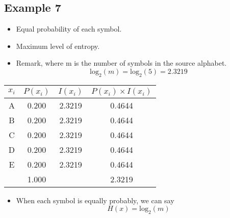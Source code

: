 \documentclass[12pt]{article}
\begin{document}
\subsection*{Example 7}
\begin{itemize}
\item Equal probability of each symbol.
\item Maximum level of entropy.
\item Remark, where m is the number of symbols in the source alphabet.
 \[\mbox{log}_2(m) = \mbox{log}_2(5) = 2.3219 \]
\end{itemize}
\begin{tabular}{|c|c|c|c|}
\hline
$x_i$	&	$P(x_i)$	&	$I(x_i)$	&	$P(x_i) \times I(x_i)$	\\ \hline	\hline
A	&	0.200	&	2.3219	&	0.4644	\\ \hline	
B	&	0.200	&	2.3219	&	0.4644	\\ \hline	
C	&	0.200	&	2.3219	&	0.4644	\\ \hline	
D	&	0.200	&	2.3219	&	0.4644	\\ \hline	
E	&	0.200	&	2.3219	&	0.4644	\\ \hline	
	&	1.000	&		&	2.3219	\\ \hline
\end{tabular} 
\begin{itemize}
\item When each symbol is equally probably, we can say
\[H(x) = \mbox{log}_2(m) \]
\end{itemize}
\end{document}
